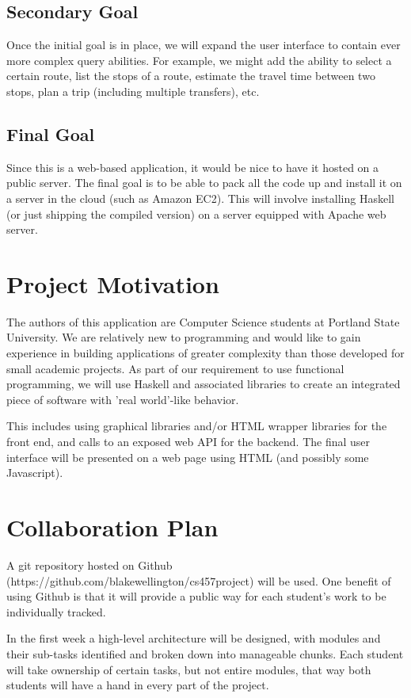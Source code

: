 \documentclass{article}
\begin{document}
\subsection*{Secondary Goal}
Once the initial goal is in place, we will expand the user interface to contain
ever more complex query abilities.  For example, we might add the ability to 
select a certain route, list the stops of a route, estimate the travel time
between two stops, plan a trip (including multiple transfers), etc.

\subsection*{Final Goal}
Since this is a web-based application, it would be nice to have it hosted on
a public server. The final goal is to be able to pack all the code up and 
install it on a server in the cloud (such as Amazon EC2). This will involve
installing Haskell (or just shipping the compiled version) on a server 
equipped with Apache web server.

\section*{Project Motivation} 
The authors of this application are Computer Science students at Portland
State University. We are relatively new to programming and would like to gain
experience in building applications of greater complexity than those developed
for small academic projects. As part of our requirement to use functional
programming, we will use Haskell and associated libraries to create an integrated 
piece of software with 'real world'-like behavior.

This includes using graphical libraries and/or HTML wrapper libraries for the 
front end, and calls to an exposed web API for the backend. The final user
interface will be presented on a web page using HTML (and possibly some Javascript).

\section*{Collaboration Plan}
A git repository hosted on Github (https://github.com/blakewellington/cs457project) 
will be used.  One benefit of using Github is that it will provide a public way
for each student's work to be individually tracked.  

In the first week a high-level architecture will be designed, with modules and 
their sub-tasks identified and broken down into manageable chunks.  Each student
will take ownership of certain tasks, but not entire modules, that way both 
students will have a hand in every part of the project.  
\end{document}
